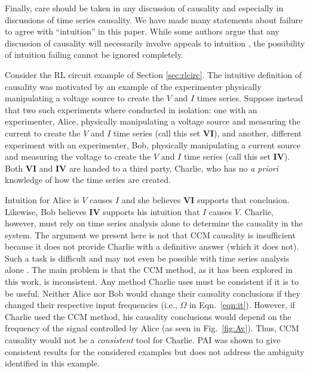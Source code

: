 \documentclass[twocolumn,aps,pre,groupedaddress]{revtex4-1}
\begin{document}
Finally, care should be taken in any discussion of causality and especially in discussions of time series causality.  We have made many statements about failure to agree with ``intuition'' in this paper.  While some authors argue that any discussion of causality will necessarily involve appeals to intuition \cite{Pearl2000}, the possibility of intuition failing cannot be ignored completely.  

Consider the RL circuit example of Section \ref{sec:rlcirc}.  The intuitive definition of causality was motivated by an example of the experimenter physically manipulating a voltage source to create the $V$ and $I$ times series.  Suppose instead that two such experiments where conducted in isolation: one with an experimenter, Alice, physically manipulating a voltage source and measuring the current to create the $V$ and $I$ time series (call this set $\mathbf{VI}$), and another, different experiment with an experimenter, Bob, physically manipulating a current source and measuring the voltage to create the $V$ and $I$ time series (call this set $\mathbf{IV}$).  Both $\mathbf{VI}$ and $\mathbf{IV}$ are handed to a third party, Charlie, who has no {\em a priori} knowledge of how the time series are created.

Intuition for Alice is $V$ causes $I$ and she believes $\mathbf{VI}$ supports that conclusion.  Likewise, Bob believes $\mathbf{IV}$ supports his intuition that $I$ causes $V$.  Charlie, however, must rely on time series analysis alone to determine the causality in the system.  The argument we present here is not that CCM causality is insufficient because it does not provide Charlie with a definitive answer (which it does not).  Such a task is difficult and may not even be possible with time series analysis alone \cite{Pearl2000}.  The main problem is that the CCM method, as it has been explored in this work, is inconsistent.  Any method Charlie uses must be consistent if it is to be useful.  Neither Alice nor Bob would change their causality conclusions if they changed their respective input frequencies (i.e., $\Omega$ in Eqn.\ \ref{eqn:it}).  However, if Charlie used the CCM method, his causality conclusions would depend on the frequency of the signal controlled by Alice (as seen in Fig.\ \ref{fig:Av}).  Thus, CCM causality would not be a {\em consistent} tool for Charlie.  PAI was shown to give consistent results for the considered examples but does not address the ambiguity identified in this example.

%

\end{document}
